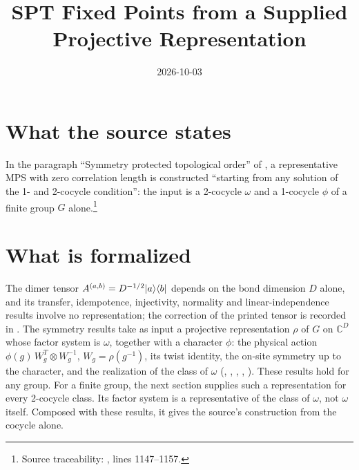 \documentclass{article}
\title{SPT Fixed Points from a Supplied Projective Representation}
\author{}
\date{2026-10-03}
\begin{document}
\maketitle
{}

\section{What the source states}
In the paragraph ``Symmetry protected topological order'' of
\cite{Cirac2021Matrix}, a representative MPS with zero correlation length is
constructed ``starting from any solution of the 1- and 2-cocycle condition'': the
input is a 2-cocycle $\omega$ and a 1-cocycle $\phi$ of a finite group $G$
alone.\footnote{Source traceability:
    , lines 1147--1157.}

\section{What is formalized}
The dimer tensor $A^{(a,b)}=D^{-1/2}|a\rangle\langle b|$ depends on the bond
dimension $D$ alone, and its transfer, idempotence, injectivity, normality and
linear-independence results involve no representation; the correction of the
printed tensor is recorded in \cite{gap:rmp_spt_fixed_point_tensor}. The
symmetry results take as input a projective representation $\rho$ of $G$ on
$\mathbb C^D$ whose factor system is $\omega$, together with a character $\phi$:
the physical action $\phi(g)\,W_g^{T}\otimes W_g^{-1}$, $W_g=\rho(g^{-1})$, its
twist identity, the on-site symmetry up to the character, and the realization of the class of
$\omega$ (,
,
,
,
). These results
hold for any group. For a finite group, the next section supplies such a
representation for every 2-cocycle class. Its factor system is a representative
of the class of $\omega$, not $\omega$ itself. Composed with these results, it
gives the source's construction from the cocycle alone.
\end{document}
